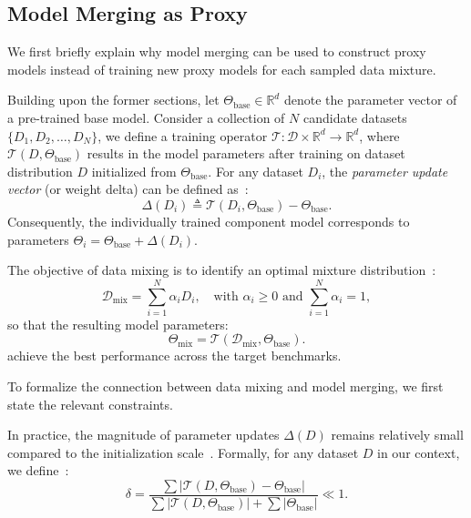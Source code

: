 \subsection{Model Merging as Proxy}
We first briefly explain why model merging can be used to construct proxy models instead of training new proxy models for each sampled data mixture.

Building upon the former sections, let $\Theta_{\text{base}} \in \mathbb{R}^d$ denote the parameter vector of a pre-trained base model. Consider a collection of $N$ candidate datasets $\{D_1, D_2, \dots, D_N\}$, we define a training operator $\mathcal{T}: \mathcal{D} \times \mathbb{R}^d \to \mathbb{R}^d$, where $\mathcal{T}(D, \Theta_{\text{base}})$ results in the model parameters after training on dataset distribution $D$ initialized from $\Theta_{\text{base}}$.
For any dataset $D_i$, the \textit{parameter update vector} (or weight delta) can be defined as~\citep{yang2024model}:
\begin{equation}
    \Delta(D_i) \triangleq \mathcal{T}(D_i, \Theta_{\text{base}}) - \Theta_{\text{base}}.
\end{equation}
Consequently, the individually trained component model corresponds to parameters $\Theta_i = \Theta_{\text{base}} + \Delta(D_i)$.

The objective of data mixing is to identify an optimal mixture distribution~\citep{xie2023doremi}:
\begin{equation}
    \mathcal{D}_{\text{mix}} = \sum_{i=1}^N \alpha_i D_i, \quad \text{with } \alpha_i \ge 0 \text{ and } \sum_{i=1}^N \alpha_i = 1,
\end{equation}
so that the resulting model parameters:
\begin{equation}
    \Theta_{\text{mix}} = \mathcal{T}(\mathcal{D}_{\text{mix}}, \Theta_{\text{base}}).
\end{equation}
achieve the best performance across the target benchmarks.  


To formalize the connection between data mixing and model merging, we first state the relevant constraints.  

In practice, the magnitude of parameter updates $\Delta(D)$ remains relatively small compared to the initialization scale~\citep{gueta-etal-2023-knowledge, wu2025shadow}. Formally, for any dataset $D$ in our context, we define~\citep{wu2025shadow}:
\begin{equation}
\label{eqa:delta}
\delta=\frac{\sum|\mathcal{T}(D, \Theta_{\text{base}}) - \Theta_{\text{base}}|} {\sum|\mathcal{T}(D, \Theta_{\text{base}})| + \sum|\Theta_{\text{base}}|}\ll 1.
\end{equation}

